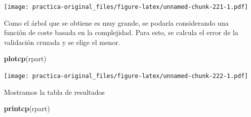 \documentclass[spanish,]{article}
\newenvironment{Shaded}{\begin{snugshade}}{\end{snugshade}}
\newcommand{\KeywordTok}[1]{\textcolor[rgb]{0.13,0.29,0.53}{\textbf{#1}}}
\newcommand{\DataTypeTok}[1]{\textcolor[rgb]{0.13,0.29,0.53}{#1}}
\newcommand{\DecValTok}[1]{\textcolor[rgb]{0.00,0.00,0.81}{#1}}
\newcommand{\FloatTok}[1]{\textcolor[rgb]{0.00,0.00,0.81}{#1}}
\newcommand{\StringTok}[1]{\textcolor[rgb]{0.31,0.60,0.02}{#1}}
\newcommand{\OperatorTok}[1]{\textcolor[rgb]{0.81,0.36,0.00}{\textbf{#1}}}
\newcommand{\NormalTok}[1]{#1}
\begin{document}
\begin{Shaded}
\end{Shaded}

\texttt{[image: practica-original\_files/figure-latex/unnamed-chunk-221-1.pdf]}

Como el árbol que se obtiene es muy grande, se podaría considerando una
función de coste basada en la complejidad. Para esto, se calcula el
error de la validación cruzada y se elige el menor.

\begin{Shaded}
\begin{Highlighting}[]
\KeywordTok{plotcp}\NormalTok{(rpart)}
\end{Highlighting}
\end{Shaded}

\texttt{[image: practica-original\_files/figure-latex/unnamed-chunk-222-1.pdf]}

Mostramos la tabla de resultados

\begin{Shaded}
\begin{Highlighting}[]
\KeywordTok{printcp}\NormalTok{(rpart)}
\end{Highlighting}
\end{Shaded}
\end{document}
